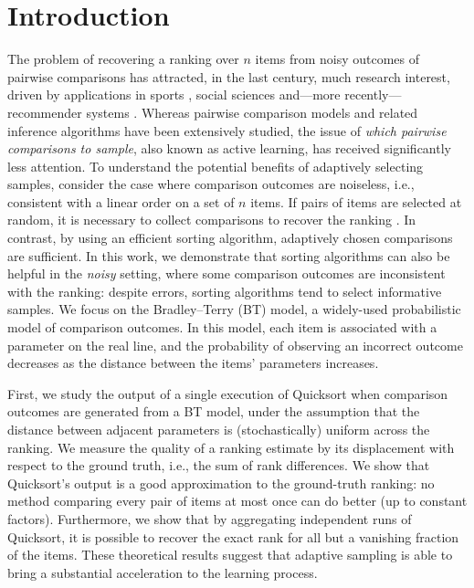 \section{Introduction}  %
\label{sec:intro}

The problem of recovering a ranking over $n$ items from noisy outcomes of pairwise comparisons has attracted, in the last century, much research interest, driven by applications in sports \citep{elo1978rating}, social sciences \citep{thurstone1927law, salganik2015wiki} and---more recently---recommender systems \citep{houlsby2012collaborative}.
Whereas pairwise comparison models and related inference algorithms have been extensively studied, the issue of \emph{which pairwise comparisons to sample}, also known as active learning, has received significantly less attention.
To understand the potential benefits of adaptively selecting samples, consider the case where comparison outcomes are noiseless, i.e., consistent with a linear order on a set of $n$ items.
If pairs of items are selected at random, it is necessary to collect  comparisons to recover the ranking \citep{alon1994linear}.
In contrast, by using an efficient sorting algorithm,  adaptively chosen comparisons are sufficient.
In this work, we demonstrate that sorting algorithms can also be helpful in the \emph{noisy} setting, where some comparison outcomes are inconsistent with the ranking: despite errors, sorting algorithms tend to select informative samples.
We focus on the Bradley--Terry (BT) model, a widely-used probabilistic model of comparison outcomes.
In this model, each item is associated with a parameter on the real line, and the probability of observing an incorrect outcome decreases as the distance between the items' parameters increases.

First, we study the output of a single execution of Quicksort when comparison outcomes are generated from a BT model, under the assumption that the distance between adjacent parameters is (stochastically) uniform across the ranking.
We measure the quality of a ranking estimate by its displacement with respect to the ground truth, i.e., the sum of rank differences.
We show that Quicksort's output is a good approximation to the ground-truth ranking: no method comparing every pair of items at most once can do better (up to constant factors).
Furthermore, we show that by aggregating  independent runs of Quicksort, it is possible to recover the exact rank for all but a vanishing fraction of the items.
These theoretical results suggest that adaptive sampling is able to bring a substantial acceleration to the learning process.

